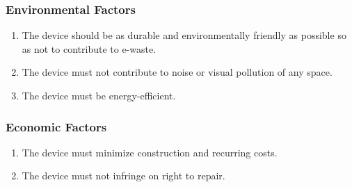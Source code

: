\subsubsection{Environmental Factors}
\begin{enumerate}
    \item The device should be as durable and
          environmentally friendly as possible so as
          not to contribute to e-waste.
    \item The device must not contribute to noise
          or visual pollution of any space.
    \item The device must be energy-efficient.
\end{enumerate}

\subsubsection{Economic Factors}
\begin{enumerate}
    \item The device must minimize
          construction and recurring costs.
    \item The device must not infringe on
          right to repair.
\end{enumerate}